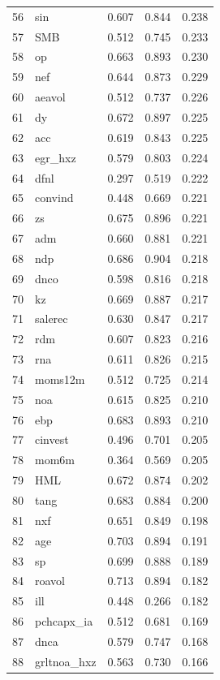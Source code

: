 \documentclass[12pt]{article}
\begin{document}
\begin{footnotesize}
\begin{longtable}{rl|c|c|c}
		56 & sin & 0.607 & 0.844 & 0.238 \\ 
		57 & SMB & 0.512 & 0.745 & 0.233 \\ 
		58 & op & 0.663 & 0.893 & 0.230 \\ 
		59 & nef & 0.644 & 0.873 & 0.229 \\ 
		60 & aeavol & 0.512 & 0.737 & 0.226 \\ 
		61 & dy & 0.672 & 0.897 & 0.225 \\ 
		62 & acc & 0.619 & 0.843 & 0.225 \\ 
		63 & egr\_hxz & 0.579 & 0.803 & 0.224 \\ 
		64 & dfnl & 0.297 & 0.519 & 0.222 \\ 
		65 & convind & 0.448 & 0.669 & 0.221 \\ 
		66 & zs & 0.675 & 0.896 & 0.221 \\ 
		67 & adm & 0.660 & 0.881 & 0.221 \\ 
		68 & ndp & 0.686 & 0.904 & 0.218 \\ 
		69 & dnco & 0.598 & 0.816 & 0.218 \\ 
		70 & kz & 0.669 & 0.887 & 0.217 \\ 
		71 & salerec & 0.630 & 0.847 & 0.217 \\ 
		72 & rdm & 0.607 & 0.823 & 0.216 \\ 
		73 & rna & 0.611 & 0.826 & 0.215 \\ 
		74 & moms12m & 0.512 & 0.725 & 0.214 \\ 
		75 & noa & 0.615 & 0.825 & 0.210 \\ 
		76 & ebp & 0.683 & 0.893 & 0.210 \\ 
		77 & cinvest & 0.496 & 0.701 & 0.205 \\ 
		78 & mom6m & 0.364 & 0.569 & 0.205 \\ 
		79 & HML & 0.672 & 0.874 & 0.202 \\ 
		80 & tang & 0.683 & 0.884 & 0.200 \\ 
		81 & nxf & 0.651 & 0.849 & 0.198 \\ 
		82 & age & 0.703 & 0.894 & 0.191 \\ 
		83 & sp & 0.699 & 0.888 & 0.189 \\ 
		84 & roavol & 0.713 & 0.894 & 0.182 \\ 
		85 & ill & 0.448 & 0.266 & 0.182 \\ 
		86 & pchcapx\_ia & 0.512 & 0.681 & 0.169 \\ 
		87 & dnca & 0.579 & 0.747 & 0.168 \\ 
		88 & grltnoa\_hxz & 0.563 & 0.730 & 0.166 \\ 

\end{longtable}
\end{footnotesize}
\end{document}
